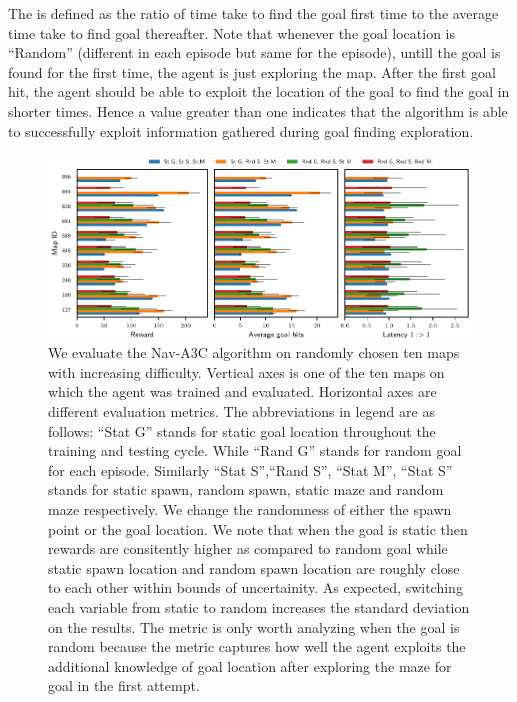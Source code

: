 The \LatencyOneGtOne is defined as the ratio of time take to find the goal first time to the average time take to find goal thereafter.
Note that whenever the goal location is ``Random'' (different in each episode but same for the episode), untill the goal is found for the first time, the agent is just exploring the map.
After the first goal hit, the agent should be able to exploit the location of the goal to find the goal in shorter times.
Hence a \LatencyOneGtOne value greater than one indicates that the algorithm is able to successfully exploit information gathered during goal finding exploration.


\begin{figure}%
  \vspace{-4em}%
  \includegraphics[width=\linewidth]{images/plot_summary_bar_plots.pdf}%
  \vspace{-1em}%
  \caption{We evaluate the Nav-A3C\cite{MiPaViICLR2017} algorithm on randomly chosen ten maps with increasing difficulty. Vertical axes is one of the ten maps on which the agent was trained and evaluated. Horizontal axes are different evaluation metrics.
    The abbreviations in legend are as follows: ``Stat G'' stands for
    static goal location throughout the training and testing cycle.
    While ``Rand G'' stands for random goal for each episode.
    Similarly ``Stat S'',``Rand S'', ``Stat M'', ``Stat S''  stands for static spawn, random spawn, static maze and random maze respectively.
    We change the randomness of either the spawn point or the goal location. We note that when the goal is static then rewards are consitently higher as compared to random goal while static spawn location and random spawn location are roughly close to each other within bounds of uncertainity. As expected, switching each variable from static to random increases the standard deviation on the results.
    The \LatencyOneGtOne metric is only worth analyzing when the goal is random because the metric captures how well the agent exploits the additional knowledge of goal location after exploring the maze for goal in the first attempt.}%
\label{fig:latency-goal-reward}%
\end{figure}

